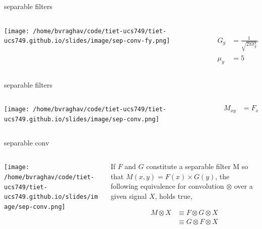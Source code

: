 \documentclass[aspectratio=169,xcolor={dvipsnames,svgnames}]{beamer}
\begin{document}
\begin{frame}[label={sec:orga275d33}]{separable filters}
\begin{columns}
\begin{column}{.5\columnwidth}
\begin{center}
\texttt{[image: /home/bvraghav/code/tiet-ucs749/tiet-ucs749.github.io/slides/image/sep-conv-fy.png]}
\end{center}
\end{column}

\begin{column}{.5\columnwidth}
\begin{align*}
  G_{y} &= \frac{1}{\sqrt{2\pi\sigma^2_y}}
          e^{-\frac{(y-\mu_y)^2}{2\sigma^2_y}}
  \\
  \mu_y &= 5 \qquad \sigma_y = \frac23
\end{align*}
\end{column}
\end{columns}
\end{frame}



\begin{frame}[label={sec:org5a560f6}]{separable filters}
\begin{columns}
\begin{column}{.5\columnwidth}
\begin{center}
\texttt{[image: /home/bvraghav/code/tiet-ucs749/tiet-ucs749.github.io/slides/image/sep-conv.png]}
\end{center}
\end{column}

\begin{column}{.5\columnwidth}
\begin{align*}
  M_{xy} &= F_x \times G_y
\end{align*}
\end{column}
\end{columns}
\end{frame}


\begin{frame}[label={sec:org5682a5d}]{separable conv}
\begin{columns}
\begin{column}{.5\columnwidth}
\begin{center}
\texttt{[image: /home/bvraghav/code/tiet-ucs749/tiet-ucs749.github.io/slides/image/sep-conv.png]}
\end{center}
\end{column}

\begin{column}{.5\columnwidth}
If \(F\) and \(G\) constitute a separable filter M so that
\(M(x,y)=F(x)\times G(y)\), the following equivalence for
convolution \(\otimes\) over a given signal \(X\), holds
true,

\begin{align*}
  M \otimes X
  &\equiv F \otimes G \otimes X
  \\
  &\equiv G \otimes F \otimes X
\end{align*}
\end{column}
\end{columns}
\end{frame}
\end{document}
